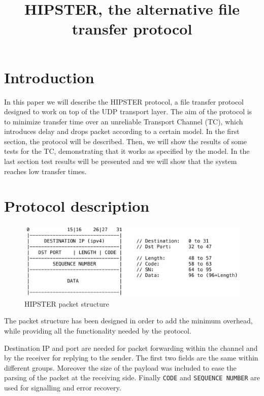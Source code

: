 \documentclass[10pt,twocolumn]{article}
\begin{document}
\title{HIPSTER, the alternative file transfer protocol}
\author{}
\date{}
\maketitle

\section{Introduction}
In this paper we will describe the HIPSTER protocol, a file transfer protocol designed to work on top of the UDP transport layer. The aim of the protocol is to minimize transfer time over an unreliable Transport Channel (TC), which introduces delay and drops packet according to a certain model. In the first section, the protocol will be described. Then, we will show the results of some tests for the TC, demonstrating that it works as specified by the model. In the last section test results will be presented and we will show that the system reaches low transfer times.

\section{Protocol description}
\begin{figure}[htp]
	\centering
	\includegraphics[width=0.95\columnwidth]{tex/images/packet_structure.pdf}
	\caption{HIPSTER packet structure}
	\label{fig:header}
\end{figure}

The packet structure has been designed in order to add the minimum overhead,
while providing all the functionality needed by the protocol.

Destination IP and port are needed for packet forwarding within the channel
and by the receiver for replying to the sender. The first two fields are the
same within different groups. Moreover the size of the payload was included to 
ease the parsing of the packet at the receiving side. Finally \texttt{CODE} and
\texttt{SEQUENCE NUMBER} are used for signalling and error recovery.
\end{document}

